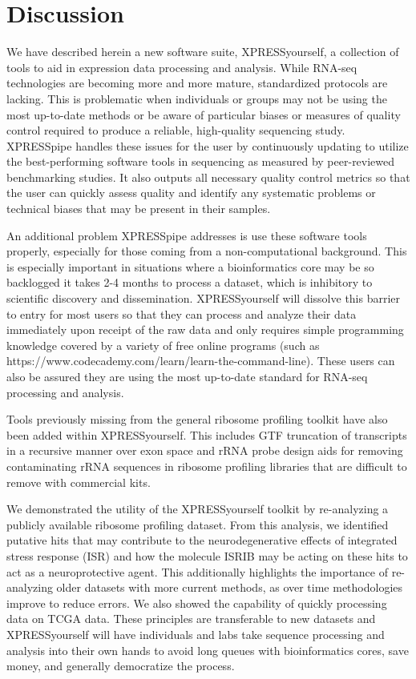 \documentclass[11pt, a4paper, oneside]{article}
\begin{document}
\section{Discussion}
We have described herein a new software suite, XPRESSyourself, a collection of tools to aid in expression data processing and analysis. While RNA-seq technologies are becoming more and more mature, standardized protocols are lacking. This is problematic when individuals or groups may not be using the most up-to-date methods or be aware of particular biases or measures of quality control required to produce a reliable, high-quality sequencing study. XPRESSpipe handles these issues for the user by continuously updating to utilize the best-performing software tools in sequencing as measured by peer-reviewed benchmarking studies. It also outputs all necessary quality control metrics so that the user can quickly assess quality and identify any systematic problems or technical biases that may be present in their samples.

An additional problem XPRESSpipe addresses is use these software tools properly, especially for those coming from a non-computational background. This is especially important in situations where a bioinformatics core may be so backlogged it takes 2-4 months to process a dataset, which is inhibitory to scientific discovery and dissemination. XPRESSyourself will dissolve this barrier to entry for most users so that they can process and analyze their data immediately upon receipt of the raw data and only requires simple programming knowledge covered by a variety of free online programs (such as https://www.codecademy.com/learn/learn-the-command-line). These users can also be assured they are using the most up-to-date standard for RNA-seq processing and analysis.

Tools previously missing from the general ribosome profiling toolkit have also been added within XPRESSyourself. This includes GTF truncation of transcripts in a recursive manner over exon space and rRNA probe design aids for removing contaminating rRNA sequences in ribosome profiling libraries that are difficult to remove with commercial kits.

We demonstrated the utility of the XPRESSyourself toolkit by re-analyzing a publicly available ribosome profiling dataset. From this analysis, we identified putative hits that may contribute to the neurodegenerative effects of integrated stress response (ISR) and how the molecule ISRIB may be acting on these hits to act as a neuroprotective agent. This additionally highlights the importance of re-analyzing older datasets with more current methods, as over time methodologies improve to reduce errors. We also showed the capability of quickly processing data on TCGA data. These principles are transferable to new datasets and XPRESSyourself will have individuals and labs take sequence processing and analysis into their own hands to avoid long queues with bioinformatics cores, save money, and generally democratize the process.
\end{document}

